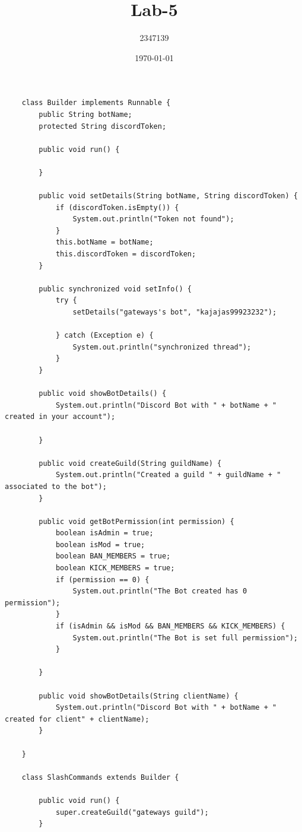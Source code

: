 \documentclass{article}
\title{Lab-5}
\author{2347139}
\date{\today}
\begin{document}
\maketitle
\begin{lstlisting}
    class Builder implements Runnable {
        public String botName;
        protected String discordToken;
    
        public void run() {
    
        }
    
        public void setDetails(String botName, String discordToken) {
            if (discordToken.isEmpty()) {
                System.out.println("Token not found");
            }
            this.botName = botName;
            this.discordToken = discordToken;
        }
    
        public synchronized void setInfo() {
            try {
                setDetails("gateways's bot", "kajajas99923232");
    
            } catch (Exception e) {
                System.out.println("synchronized thread");
            }
        }
    
        public void showBotDetails() {
            System.out.println("Discord Bot with " + botName + " created in your account");
    
        }
    
        public void createGuild(String guildName) {
            System.out.println("Created a guild " + guildName + " associated to the bot");
        }
    
        public void getBotPermission(int permission) {
            boolean isAdmin = true;
            boolean isMod = true;
            boolean BAN_MEMBERS = true;
            boolean KICK_MEMBERS = true;
            if (permission == 0) {
                System.out.println("The Bot created has 0 permission");
            }
            if (isAdmin && isMod && BAN_MEMBERS && KICK_MEMBERS) {
                System.out.println("The Bot is set full permission");
            }
    
        }
    
        public void showBotDetails(String clientName) {
            System.out.println("Discord Bot with " + botName + " created for client" + clientName);
        }
    
    }
    
    class SlashCommands extends Builder {
    
        public void run() {
            super.createGuild("gateways guild");
        }
    

\end{lstlisting}
\end{document}
